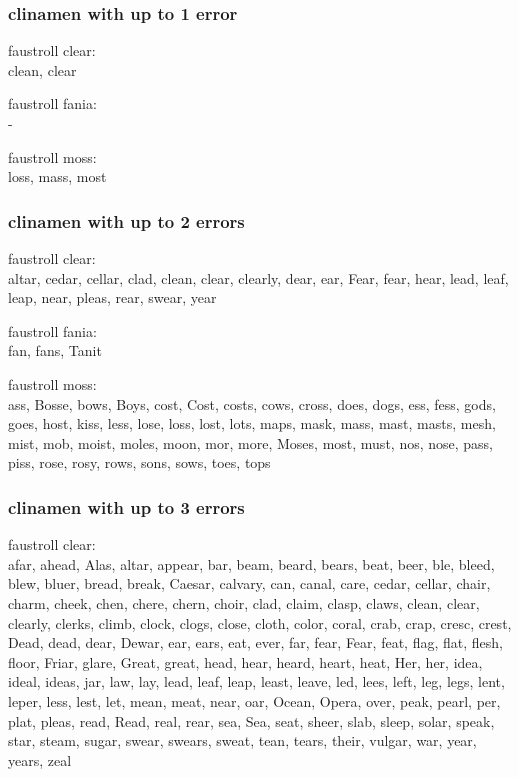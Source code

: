 \subsubsection{clinamen with up to 1 error}
faustroll clear:\\
clean, clear

faustroll fania:\\
-

faustroll moss:\\
loss, mass, most

\subsubsection{clinamen with up to 2 errors}
faustroll clear:\\
altar, cedar, cellar, clad, clean, clear, clearly, dear, ear, Fear, fear, hear, lead, leaf, leap, near, pleas, rear, swear, year

faustroll fania:\\
fan, fans, Tanit

faustroll moss:\\
ass, Bosse, bows, Boys, cost, Cost, costs, cows, cross, does, dogs, ess, fess, gods, goes, host, kiss, less, lose, loss, lost, lots, maps, mask, mass, mast, masts, mesh, mist, mob, moist, moles, moon, mor, more, Moses, most, must, nos, nose, pass, piss, rose, rosy, rows, sons, sows, toes, tops

\subsubsection{clinamen with up to 3 errors}

faustroll clear:\\
afar, ahead, Alas, altar, appear, bar, beam, beard, bears, beat, beer, ble, bleed, blew, bluer, bread, break, Caesar, calvary, can, canal, care, cedar, cellar, chair, charm, cheek, chen, chere, chern, choir, clad, claim, clasp, claws, clean, clear, clearly, clerks, climb, clock, clogs, close, cloth, color, coral, crab, crap, cresc, crest, Dead, dead, dear, Dewar, ear, ears, eat, ever, far, fear, Fear, feat, flag, flat, flesh, floor, Friar, glare, Great, great, head, hear, heard, heart, heat, Her, her, idea, ideal, ideas, jar, law, lay, lead, leaf, leap, least, leave, led, lees, left, leg, legs, lent, leper, less, lest, let, mean, meat, near, oar, Ocean, Opera, over, peak, pearl, per, plat, pleas, read, Read, real, rear, sea, Sea, seat, sheer, slab, sleep, solar, speak, star, steam, sugar, swear, swears, sweat, tean, tears, their, vulgar, war, year, years, zeal


